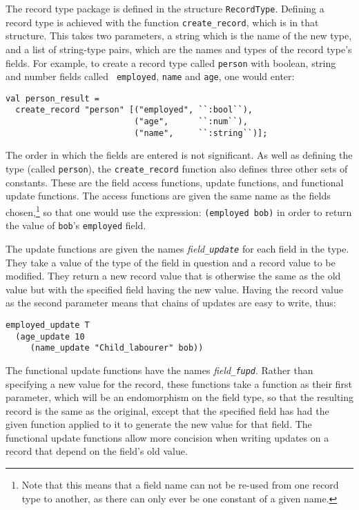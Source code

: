 \newcommand{\createrec}{{\tt create\_record}} The record type package
is defined in the structure {\tt RecordType}.  Defining a record type
is achieved with the function \createrec, which is in that structure.
This takes two parameters, a string which is the name of the new type,
and a list of string-type pairs, which are the names and types of the
record type's fields.  For example, to create a record type called
{\tt person} with boolean, string and number fields called {\tt
  employed}, {\tt name} and {\tt age}, one would enter:
\begin{verbatim}
val person_result =
  create_record "person" [("employed", ``:bool``),
                          ("age",      ``:num``),
                          ("name",     ``:string``)];
\end{verbatim}
The order in which the fields are entered is not significant. As well as
defining the type (called {\tt person}), the \createrec{} function also
defines three other sets of constants.  These are the field access
functions, update functions, and functional update functions.  The
access functions are given the same name as the fields
chosen,\footnote{Note that this means that a field name can not be
re-used from one record type to another, as there can only ever be one
constant of a given name.} so that one would use the expression:
\mbox{\tt (employed bob)} in order to return the value of {\tt bob}'s
{\tt employed} field.

The update functions are given the names {\it field\tt\_update} for
each field in the type.  They take a value of the type of the field in
question and a record value to be modified.  They return a new record
value that is otherwise the same as the old value but with the
specified field having the new value.  Having the record value as the
second parameter means that chains of updates are easy to write, thus:
\begin{verbatim}
employed_update T
  (age_update 10
     (name_update "Child_labourer" bob))
\end{verbatim}

The functional update functions have the names {\it field\tt\_fupd}.
Rather than specifying a new value for the record, these functions
take a function as their first parameter, which will be an
endomorphism on the field type, so that the resulting record is the
same as the original, except that the specified field has had the
given function applied to it to generate the new value for that
field.  The functional update functions allow more concision when
writing updates on a record that depend on the field's old value.

